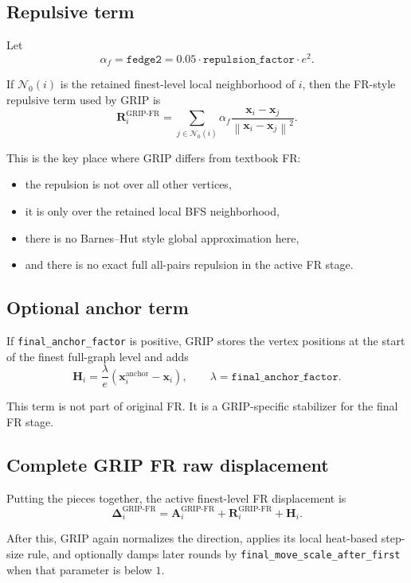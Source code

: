 \documentclass[11pt]{article}
\newcommand{\vect}[1]{\boldsymbol{#1}}
\newcommand{\norm}[1]{\left\lVert #1 \right\rVert}
\begin{document}
\subsection{Repulsive term}

Let
\[
\alpha_f = \texttt{fedge2}
= 0.05 \cdot \texttt{repulsion\_factor} \cdot e^2.
\]

If $\mathcal{N}_{0}(i)$ is the retained finest-level local neighborhood of $i$,
then the FR-style repulsive term used by GRIP is
\[
\vect{R}_i^{\text{GRIP-FR}}
=
\sum_{j \in \mathcal{N}_{0}(i)}
\alpha_f
\frac{\vect{x}_i - \vect{x}_j}{\norm{\vect{x}_i - \vect{x}_j}^2}.
\]

This is the key place where GRIP differs from textbook FR:
\begin{itemize}[leftmargin=1.5em]
\item the repulsion is not over all other vertices,
\item it is only over the retained local BFS neighborhood,
\item there is no Barnes--Hut style global approximation here,
\item and there is no exact full all-pairs repulsion in the active FR stage.
\end{itemize}

\subsection{Optional anchor term}

If \texttt{final\_anchor\_factor} is positive, GRIP stores the vertex positions
at the start of the finest full-graph level and adds
\[
\vect{H}_i
=
\frac{\lambda}{e}
\left(
\vect{x}_i^{\text{anchor}} - \vect{x}_i
\right),
\qquad
\lambda = \texttt{final\_anchor\_factor}.
\]

This term is not part of original FR. It is a GRIP-specific stabilizer for the
final FR stage.

\subsection{Complete GRIP FR raw displacement}

Putting the pieces together, the active finest-level FR displacement is
\[
\vect{\Delta}_i^{\text{GRIP-FR}}
=
\vect{A}_i^{\text{GRIP-FR}}
+
\vect{R}_i^{\text{GRIP-FR}}
+
\vect{H}_i.
\]

After this, GRIP again normalizes the direction, applies its local heat-based
step-size rule, and optionally damps later rounds by
\texttt{final\_move\_scale\_after\_first} when that parameter is below $1$.
\end{document}
